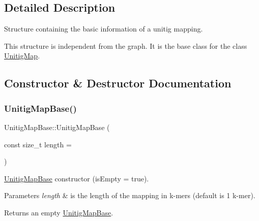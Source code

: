 \subsection{Detailed Description}
Structure containing the basic information of a unitig mapping. 

This structure is independent from the graph. It is the base class for the class \hyperlink{classUnitigMap}{Unitig\+Map}. 

\subsection{Constructor \& Destructor Documentation}
\mbox{\label{structUnitigMapBase_a080e546f9f6a9027490501332b656473}} 
\subsubsection{\texorpdfstring{Unitig\+Map\+Base()}{UnitigMapBase()}\hspace{0.1cm}{\footnotesize\ttfamily [1/2]}}
{\footnotesize\ttfamily Unitig\+Map\+Base\+::\+Unitig\+Map\+Base (\begin{DoxyParamCaption}\item[{const size\+\_\+t}]{length = {} }\end{DoxyParamCaption})}



\hyperlink{structUnitigMapBase}{Unitig\+Map\+Base} constructor (is\+Empty = true). 


\begin{DoxyParams}{Parameters}
{\em length} & is the length of the mapping in k-\/mers (default is 1 k-\/mer). \\
\hline
\end{DoxyParams}
\begin{DoxyReturn}{Returns}
an empty \hyperlink{structUnitigMapBase}{Unitig\+Map\+Base}. 
\end{DoxyReturn}
\mbox{\label{structUnitigMapBase_a04975745bfe61f5d067acb13940d2975}} 
